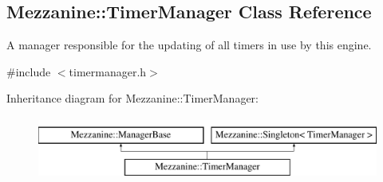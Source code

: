 \hypertarget{classMezzanine_1_1TimerManager}{
\subsection{Mezzanine::TimerManager Class Reference}
\label{classMezzanine_1_1TimerManager}
}


A manager responsible for the updating of all timers in use by this engine.  




{\ttfamily \#include $<$timermanager.h$>$}

Inheritance diagram for Mezzanine::TimerManager:\begin{figure}[H]
\begin{center}
\leavevmode
\includegraphics[height=2.000000cm]{classMezzanine_1_1TimerManager}
\end{center}
\end{figure}
